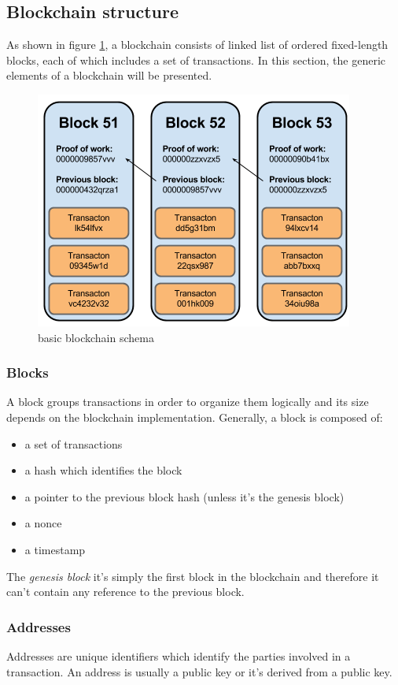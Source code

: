 \subsection{Blockchain structure}
As shown in figure \ref{fig:blockchain-basic-schema}, a blockchain consists of
linked list of ordered fixed-length blocks, each of which includes a set of transactions.
In this section, the generic elements of a blockchain will be presented.
\begin{figure}[!htb]
	\centering
	\includegraphics[width=0.5\linewidth]{img/blockchain-basic-schema.png}
	\caption{basic blockchain schema}
	\label{fig:blockchain-basic-schema}
\end{figure}

\subsubsection*{Blocks}
A block groups transactions in order to organize them logically and its size
depends on the blockchain implementation. Generally, a block is composed of:
\begin{itemize}
  \item a set of transactions
  \item a hash which identifies the block
  \item a pointer to the previous block hash (unless it's the genesis block)
  \item a nonce
  \item a timestamp
\end{itemize}
The \emph{genesis block} it's simply the first block in the blockchain and therefore
it can't contain any reference to the previous block.


\subsubsection*{Addresses}
Addresses are unique identifiers which identify the parties involved in a
transaction. An address is usually a public key or it's derived from a public key.


